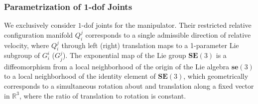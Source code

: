 \documentclass[lettersize,journal]{IEEEtran}
\def \SE {\textbf{SE}(3)}
\def \se {\textbf{se}(3)}
\def \R  {\mathbb{R}}
\theoremstyle{remark}
\begin{document}
\subsubsection{Parametrization of 1-dof Joints}
We exclusively consider $1$-dof joints for the manipulator. Their restricted relative configuration manifold $Q_i^j$  corresponds to a single admissible direction of relative velocity, where $Q_i^j$ through left (right) translation maps to a 1-parameter Lie subgroup of $G_i^i$ ($G^j_j$). %
The exponential map of the Lie group $\SE$ is a diffeomorphism from a local neighborhood of the origin of the Lie algebra $\se$ to a local neighborhood of the identity element of $\SE$, which geometrically corresponds to a simultaneous rotation about and translation along a fixed vector in $\R^3$, where the ratio of translation to rotation is constant.  %
\end{document}
